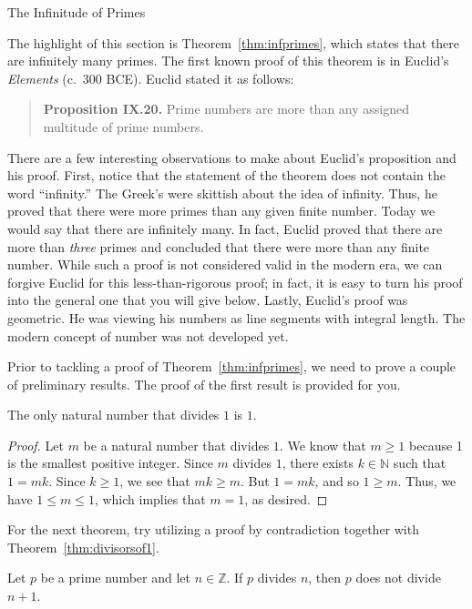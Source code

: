 \begin{section}{The Infinitude of Primes}\label{sec:infinitude of primes}

The highlight of this section is Theorem~\ref{thm:infprimes}, which states that there are infinitely many primes. The first known proof of this theorem is in Euclid's \emph{Elements} (c.~300 BCE). Euclid stated it as follows: 
\begin{quote}
\textbf{Proposition IX.20.} Prime numbers are more than any assigned multitude of prime numbers.
\end{quote}
There are a few interesting observations to make about Euclid's proposition and his proof. First, notice that the statement of the theorem does not contain the word ``infinity.'' The Greek's were skittish about the idea of infinity. Thus, he proved that there were more primes than any given finite number. Today we would say that there are infinitely many. In fact, Euclid proved that there are more than \emph{three} primes and concluded that there were more than any finite number. While such a proof is not considered valid in the modern era, we can forgive Euclid for this less-than-rigorous proof;  in fact, it is easy to turn his proof into the general one that you will give below. Lastly, Euclid's proof was geometric. He was viewing his numbers as line segments with integral length. The modern concept of number was not developed yet.

Prior to tackling a proof of Theorem~\ref{thm:infprimes}, we need to prove a couple of preliminary results.  The proof of the first result is provided for you. 

\begin{theorem}\label{thm:divisorsof1}
The only natural number that divides $1$ is $1$.  
\end{theorem}

\begin{proof}
Let $m$ be a natural number that divides $1$. We know that $m\geq 1$ because 1 is the smallest positive integer. Since $m$ divides $1$, there exists $k\in \mathbb{N}$ such that $1=mk$. Since $k\geq 1$, we see that $mk\geq m$.  But $1=mk$, and so $1\geq m$.  Thus, we have $1\leq m \leq 1$, which implies that $m=1$, as desired.
\end{proof}

For the next theorem, try utilizing a proof by contradiction together with Theorem~\ref{thm:divisorsof1}.

\begin{theorem}\label{thm:plus1}
Let $p$ be a prime number and let $n\in \mathbb{Z}$. If $p$ divides $n$, then $p$ does not divide $n+1$.
\end{theorem}


\end{section}
